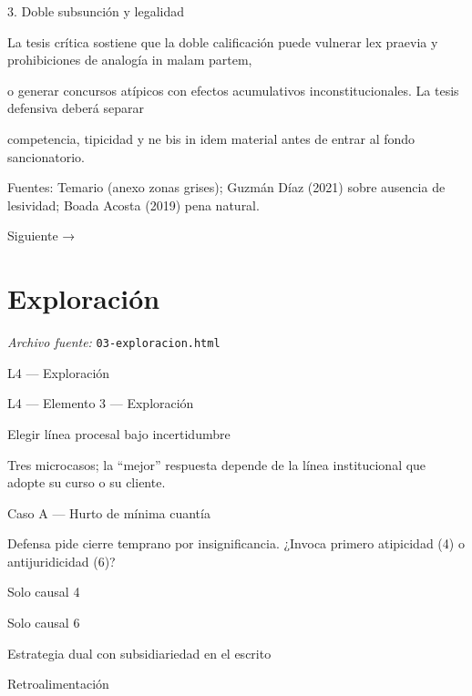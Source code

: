 \documentclass[11pt,a4paper]{article}
\begin{document}
      3. Doble subsunción y legalidad\par


        La tesis crítica sostiene que la doble calificación puede vulnerar lex praevia y prohibiciones de analogía in malam partem,\par
        o generar concursos atípicos con efectos acumulativos inconstitucionales. La tesis defensiva deberá separar\par
        competencia, tipicidad y ne bis in idem material antes de entrar al fondo sancionatorio.\par





      Fuentes: Temario (anexo zonas grises); Guzmán Díaz (2021) sobre ausencia de lesividad; Boada Acosta (2019) pena natural.\par


    Siguiente →\par

\section{Exploraci\'on}
\noindent\textit{Archivo fuente:} \texttt{03-exploracion.html}

L4 — Exploración\par





    L4 — Elemento 3 — Exploración\par
    Elegir línea procesal bajo incertidumbre\par

    Tres microcasos; la “mejor” respuesta depende de la línea institucional que adopte su curso o su cliente.\par


      Caso A — Hurto de mínima cuantía\par

      Defensa pide cierre temprano por insignificancia. ¿Invoca primero atipicidad (4) o antijuridicidad (6)?\par

       Solo causal 4\par
       Solo causal 6\par
       Estrategia dual con subsidiariedad en el escrito\par
      Retroalimentación\par
\end{document}
